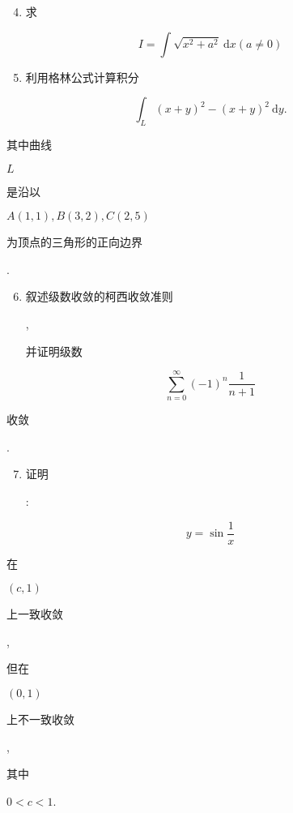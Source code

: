 \documentclass[10pt]{article}
\begin{document}
\begin{enumerate}
  \setcounter{enumi}{3}
  \item \begin{CJK}{UTF8}{mj}求\end{CJK}
\end{enumerate}
$$
I=\int \sqrt{x^{2}+a^{2}} \mathrm{~d} x(a \neq 0)
$$

\begin{enumerate}
  \setcounter{enumi}{4}
  \item \begin{CJK}{UTF8}{mj}利用格林公式计算积分\end{CJK}
\end{enumerate}
$$
\int_{L}(x+y)^{2}-(x+y)^{2} \mathrm{~d} y .
$$
\begin{CJK}{UTF8}{mj}其中曲线\end{CJK} $L$ \begin{CJK}{UTF8}{mj}是沿以\end{CJK} $A(1,1), B(3,2), C(2,5)$ \begin{CJK}{UTF8}{mj}为顶点的三角形的正向边界\end{CJK}.

\begin{enumerate}
  \setcounter{enumi}{5}
  \item \begin{CJK}{UTF8}{mj}叙述级数收敛的柯西收敛准则\end{CJK}, \begin{CJK}{UTF8}{mj}并证明级数\end{CJK}
\end{enumerate}
$$
\sum_{n=0}^{\infty}(-1)^{n} \frac{1}{n+1}
$$
\begin{CJK}{UTF8}{mj}收敛\end{CJK}.

\begin{enumerate}
  \setcounter{enumi}{6}
  \item \begin{CJK}{UTF8}{mj}证明\end{CJK}:
\end{enumerate}
$$
y=\sin \frac{1}{x}
$$
\begin{CJK}{UTF8}{mj}在\end{CJK} $(c, 1)$ \begin{CJK}{UTF8}{mj}上一致收敛\end{CJK}, \begin{CJK}{UTF8}{mj}但在\end{CJK} $(0,1)$ \begin{CJK}{UTF8}{mj}上不一致收敛\end{CJK}, \begin{CJK}{UTF8}{mj}其中\end{CJK} $0<c<1$.
\end{document}
